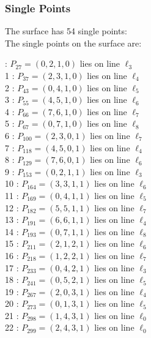 \documentclass{article}
\begin{document}
{\subsubsection*{Single Points}
The surface has 54 single points:\\
The single points on the surface are:\\
\begin{multicols}{2}
 : $P_{27}=( 0, 2, 1, 0 )$ lies on line $\ell_{3}$\\
1 : $P_{37}=( 2, 3, 1, 0 )$ lies on line $\ell_{4}$\\
2 : $P_{43}=( 0, 4, 1, 0 )$ lies on line $\ell_{5}$\\
3 : $P_{55}=( 4, 5, 1, 0 )$ lies on line $\ell_{6}$\\
4 : $P_{66}=( 7, 6, 1, 0 )$ lies on line $\ell_{7}$\\
5 : $P_{67}=( 0, 7, 1, 0 )$ lies on line $\ell_{8}$\\
6 : $P_{100}=( 2, 3, 0, 1 )$ lies on line $\ell_{7}$\\
7 : $P_{118}=( 4, 5, 0, 1 )$ lies on line $\ell_{4}$\\
8 : $P_{129}=( 7, 6, 0, 1 )$ lies on line $\ell_{6}$\\
9 : $P_{153}=( 0, 2, 1, 1 )$ lies on line $\ell_{3}$\\
10 : $P_{164}=( 3, 3, 1, 1 )$ lies on line $\ell_{6}$\\
11 : $P_{169}=( 0, 4, 1, 1 )$ lies on line $\ell_{5}$\\
12 : $P_{182}=( 5, 5, 1, 1 )$ lies on line $\ell_{7}$\\
13 : $P_{191}=( 6, 6, 1, 1 )$ lies on line $\ell_{4}$\\
14 : $P_{193}=( 0, 7, 1, 1 )$ lies on line $\ell_{8}$\\
15 : $P_{211}=( 2, 1, 2, 1 )$ lies on line $\ell_{6}$\\
16 : $P_{218}=( 1, 2, 2, 1 )$ lies on line $\ell_{7}$\\
17 : $P_{233}=( 0, 4, 2, 1 )$ lies on line $\ell_{3}$\\
18 : $P_{241}=( 0, 5, 2, 1 )$ lies on line $\ell_{5}$\\
19 : $P_{267}=( 2, 0, 3, 1 )$ lies on line $\ell_{4}$\\
20 : $P_{273}=( 0, 1, 3, 1 )$ lies on line $\ell_{5}$\\
21 : $P_{298}=( 1, 4, 3, 1 )$ lies on line $\ell_{0}$\\
22 : $P_{299}=( 2, 4, 3, 1 )$ lies on line $\ell_{0}$\\

\end{multicols}}
\end{document}
